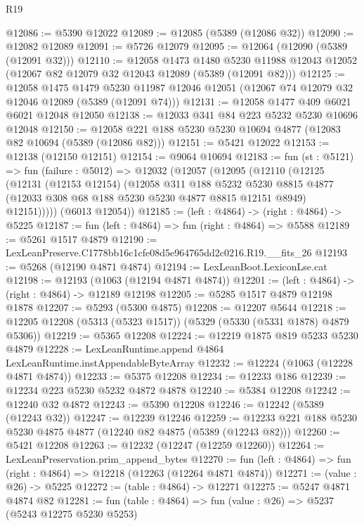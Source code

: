\begin{lexlean}{R19}
\begin{coremodule}
@12086 := @5390 @12022
@12089 := @12085 (@5389 (@12086 @32))
@12090 := @12082 @12089
@12091 := @5726 @12079
@12095 := @12064 (@12090 (@5389 (@12091 @32)))
@12110 := @12058
    @1473
    @1480
    @5230
    @11988
    @12043
    @12052
    (@12067 @82 @12079 @32 @12043 @12089 (@5389 (@12091 @82)))
@12125 := @12058
    @1475
    @1479
    @5230
    @11987
    @12046
    @12051
    (@12067 @74 @12079 @32 @12046 @12089 (@5389 (@12091 @74)))
@12131 := @12058 @1477 @409 @6021 @6021 @12048 @12050
@12138 := @12033 @341 @84 @223 @5232 @5230 @10696 @12048
@12150 := @12058 @221 @188 @5230 @5230 @10694 @4877 (@12083 @82 @10694 (@5389 (@12086 @82)))
@12151 := @5421 @12022
@12153 := @12138 (@12150 @12151)
@12154 := @9064 @10694
@12183 := fun (st : @5121) =>
  fun (failure : @5012) =>
  @12032
    (@12057
      (@12095
        (@12110
          (@12125
            (@12131
              (@12153 @12154)
              (@12058
                @311
                @188
                @5232
                @5230
                @8815
                @4877
                (@12033 @308 @68 @188 @5230 @5230 @4877 @8815 @12151 @8949)
                @12151)))))
      (@6013 @12054))
@12185 := (left : @4864) -> (right : @4864) -> @5225
@12187 := fun (left : @4864) => fun (right : @4864) => @5588
@12189 := @5261 @1517 @4879
@12190 := LexLeanPreserve.C1778bb16c1cfe08d5e964765dd2c0216.R19.__fits_26
@12193 := @5268 (@12190 @4871 @4874)
@12194 := LexLeanBoot.LexiconLse.cat
@12198 := @12193 (@1063 (@12194 @4871 @4874))
@12201 := (left : @4864) -> (right : @4864) -> @12189 @12198
@12205 := @5285 @1517 @4879 @12198 @1878
@12207 := @5293 (@5300 @4875)
@12208 := @12207 @5644
@12218 := @12205 @12208 (@5313 (@5323 @1517)) (@5329 (@5330 (@5331 @1878) @4879 @5306))
@12219 := @5365 @12208
@12224 := @12219 @1875 @819 @5233 @5230 @4879
@12228 := LexLeanRuntime.append @4864 LexLeanRuntime.instAppendableByteArray
@12232 := @12224 (@1063 (@12228 @4871 @4874))
@12233 := @5375 @12208
@12234 := @12233 @186
@12239 := @12234 @223 @5230 @5232 @4872 @4878
@12240 := @5384 @12208
@12242 := @12240 @32 @4872
@12243 := @5390 @12208
@12246 := @12242 (@5389 (@12243 @32))
@12247 := @12239 @12246
@12259 := @12233 @221 @188 @5230 @5230 @4875 @4877 (@12240 @82 @4875 (@5389 (@12243 @82)))
@12260 := @5421 @12208
@12263 := @12232 (@12247 (@12259 @12260))
@12264 := LexLeanPreservation.prim_append_bytes
@12270 := fun (left : @4864) => fun (right : @4864) => @12218 (@12263 (@12264 @4871 @4874))
@12271 := (value : @26) -> @5225
@12272 := (table : @4864) -> @12271
@12275 := @5247 @4871 @4874 @82
@12281 := fun (table : @4864) => fun (value : @26) => @5237 (@5243 @12275 @5230 @5253)

\end{coremodule}
\end{lexlean}
